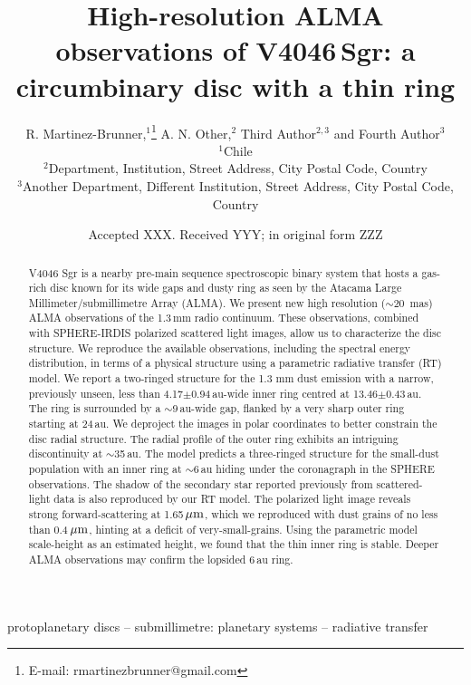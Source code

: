\documentclass[letters,usenatbib,times]{mnras}
\title[High-resolution ALMA observations of V4046\,Sgr]{High-resolution ALMA observations of V4046\,Sgr: a circumbinary disc with a thin ring}
\author[R. Martinez Brunner et al.]{
R. Martinez-Brunner,$^{1}$\thanks{E-mail: rmartinezbrunner@gmail.com}
A. N. Other,$^{2}$
Third Author$^{2,3}$
and Fourth Author$^{3}$
\\
$^{1}$Chile\\
$^{2}$Department, Institution, Street Address, City Postal Code, Country\\
$^{3}$Another Department, Different Institution, Street Address, City Postal Code, Country
}
\date{Accepted XXX. Received YYY; in original form ZZZ}
\begin{document}
\label{firstpage}
\pagerange{\pageref{firstpage}--\pageref{lastpage}}
\maketitle

\begin{abstract}
    V4046 Sgr is a nearby pre-main sequence spectroscopic binary system that hosts a gas-rich disc known for its wide gaps and dusty ring as seen by the Atacama Large Millimeter/submillimetre Array (ALMA). We present new high resolution ($\sim$20\, mas) ALMA observations of the 1.3\,mm radio continuum. These observations, combined with SPHERE-IRDIS polarized scattered light images, allow us to characterize the disc structure. We reproduce the available observations, including the spectral energy distribution, in terms of a physical structure using a parametric radiative transfer (RT) model. We report a two-ringed structure for the 1.3 mm dust emission with a narrow, previously unseen, less than 4.17$\pm$0.94\,au-wide inner ring centred at 13.46$\pm$0.43\,au. The ring is surrounded by a $\sim$9\,au-wide gap, flanked by a very sharp outer ring starting at 24\,au. We deproject the images in polar coordinates to better constrain the disc radial structure. The radial profile of the outer ring exhibits an intriguing discontinuity at $\sim$35\,au. The model predicts a three-ringed structure for the small-dust population with an inner ring at $\sim$6\,au hiding under the coronagraph in the SPHERE observations. The shadow of the secondary star reported previously from scattered-light data is also reproduced by our RT model. The polarized light image reveals strong forward-scattering at 1.65\,$\hbox{$\mu$m}$, which we reproduced with dust grains of no less than 0.4\,$\hbox{$\mu$m}$, hinting at a deficit of very-small-grains. Using the parametric model scale-height as an estimated height, we found that the thin inner ring is stable. Deeper ALMA observations may confirm the lopsided 6\,au ring.
\end{abstract}

\begin{keywords}
 protoplanetary discs -- submillimetre: planetary systems -- radiative transfer
\end{keywords}


\end{document}
